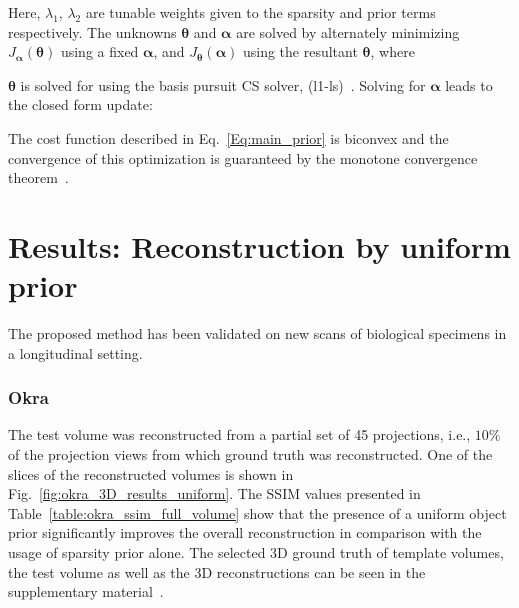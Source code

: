 \documentclass[journal]{IEEEtran}
\begin{document}
Here, $\lambda_1$, $\lambda_2$ are tunable weights given to the sparsity and prior terms respectively. The unknowns $\boldsymbol{\theta}$ and $\boldsymbol{\alpha}$
are solved by alternately minimizing $J_{\boldsymbol{\alpha}}(\boldsymbol{\theta})$ using a fixed $\boldsymbol{\alpha}$, and $J_{\boldsymbol\theta}(\boldsymbol{\alpha})$ using the resultant $\boldsymbol{\theta}$, where 

$\boldsymbol{\theta}$ is solved for using the basis pursuit CS solver, (l1-ls)~\cite{l1ls}. Solving for $\boldsymbol{\alpha}$ leads to the closed form update:

The cost function described in Eq.~\ref{Eq:main_prior} is biconvex and the convergence of this optimization is guaranteed by the monotone convergence theorem~\cite{monotone}.
 \vspace{2mm}

 \section{Results: Reconstruction by uniform prior}
 \label{sec:results_uniform_prior}

 
 The proposed method has been validated on new scans of biological
 specimens in a longitudinal setting. 

\subsubsection{\textbf{Okra}}
\label{Sec:okra_uniform}
The test volume was reconstructed from a partial set of
45 projections, i.e., $10\%$ of the projection views from which ground
truth was reconstructed.
 One of the slices of the reconstructed volumes is shown in
 Fig.~\ref{fig:okra_3D_results_uniform}. The SSIM values presented in
 Table~\ref{table:okra_ssim_full_volume} show that the presence of a
 uniform object prior significantly improves the overall
 reconstruction in comparison with the usage of sparsity prior alone.
 The selected 3D ground truth of template volumes, the test volume as
 well as the 3D reconstructions can be seen in the supplementary
 material~\cite{supp_paper}.
\end{document}
